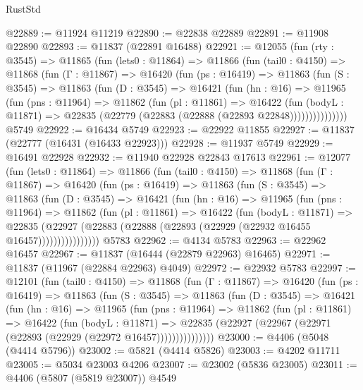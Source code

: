 \begin{lexlean}{RustStd}
\begin{coremodule}
@22889 := @11924 @11219
@22890 := @22838 @22889
@22891 := @11908 @22890
@22893 := @11837 (@22891 @16488)
@22921 := @12055
    (fun (rty : @3545) =>
    @11865
      (fun (lets0 : @11864) =>
      @11866
        (fun (tail0 : @4150) =>
        @11868
          (fun (Γ : @11867) =>
          @16420
            (fun (ps : @16419) =>
            @11863
              (fun (S : @3545) =>
              @11863
                (fun (D : @3545) =>
                @16421
                  (fun (hn : @16) =>
                  @11965
                    (fun (pns : @11964) =>
                    @11862
                      (fun (pl : @11861) =>
                      @16422
                        (fun (bodyL : @11871) =>
                        @22835 (@22779 (@22883 (@22888 (@22893 @22848)))))))))))))))
    @5749
@22922 := @16434 @5749
@22923 := @22922 @11855
@22927 := @11837 (@22777 (@16431 (@16433 @22923)))
@22928 := @11937 @5749
@22929 := @16491 @22928
@22932 := @11940 @22928 @22843 @17613
@22961 := @12077
    (fun (lets0 : @11864) =>
    @11866
      (fun (tail0 : @4150) =>
      @11868
        (fun (Γ : @11867) =>
        @16420
          (fun (ps : @16419) =>
          @11863
            (fun (S : @3545) =>
            @11863
              (fun (D : @3545) =>
              @16421
                (fun (hn : @16) =>
                @11965
                  (fun (pns : @11964) =>
                  @11862
                    (fun (pl : @11861) =>
                    @16422
                      (fun (bodyL : @11871) =>
                      @22835
                        (@22927
                          (@22883 (@22888 (@22893 (@22929 (@22932 @16455 @16457))))))))))))))))
    @5783
@22962 := @4134 @5783
@22963 := @22962 @16457
@22967 := @11837 (@16444 (@22879 @22963) @16465)
@22971 := @11837 (@11967 (@22884 @22963) @4049)
@22972 := @22932 @5783
@22997 := @12101
    (fun (tail0 : @4150) =>
    @11868
      (fun (Γ : @11867) =>
      @16420
        (fun (ps : @16419) =>
        @11863
          (fun (S : @3545) =>
          @11863
            (fun (D : @3545) =>
            @16421
              (fun (hn : @16) =>
              @11965
                (fun (pns : @11964) =>
                @11862
                  (fun (pl : @11861) =>
                  @16422
                    (fun (bodyL : @11871) =>
                    @22835 (@22927 (@22967 (@22971 (@22893 (@22929 (@22972 @16457)))))))))))))))
@23000 := @4406 (@5048 (@4414 @5796))
@23002 := @5821 (@4414 @5826)
@23003 := @4202 @11711
@23005 := @5034 @23003 @4206
@23007 := @23002 (@5836 @23005)
@23011 := @4406 (@5807 (@5819 @23007)) @4549

\end{coremodule}
\end{lexlean}
